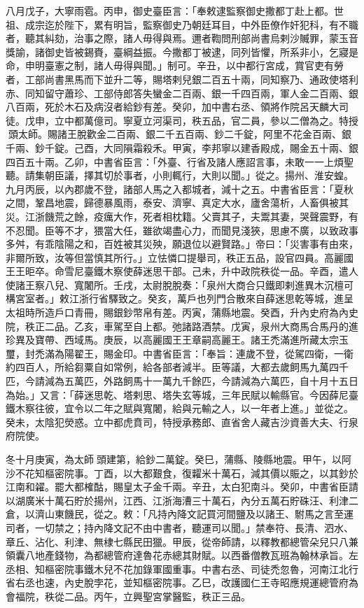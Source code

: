 \begin{pinyinscope}
 八月戊子，大寧雨雹。丙申，御史臺臣言：「奉敕逮監察御史撒都丁赴上都。世祖、成宗迄於陛下，累有明旨，監察御史乃朝廷耳目，中外臣僚作奸犯科，有不職者，聽其糾劾，治事之際，諸人毋得與焉。邇者鞫問刑部尚書烏剌沙贓罪，蒙玉音獎諭，諸御史皆被錫賚，臺綱益振。今撒都丁被逮，同列皆懼，所系非小，乞寢是命，申明臺憲之制，諸人毋得與聞。」制可。辛丑，以中都行宮成，賞官吏有勞者，工部尚書黑馬而下並升二等，賜塔剌兒銀二百五十兩，同知察乃、通政使塔利赤、同知留守蕭珍、工部侍郎答失蠻金二百兩、銀一千四百兩，軍人金二百兩、銀八百兩，死於木石及病沒者給鈔有差。癸卯，加中書右丞、領將作院呂天麟大司徒。戊申，立中都萬億司。寧夏立河渠司，秩五品，官二員，參以二僧為之。特授頭太師。賜諸王脫歡金二百兩、銀二千五百兩、鈔二千錠，阿里不花金百兩、銀千兩、鈔千錠。己酉，大同隕霜殺禾。甲寅，李邦寧以建香殿成，賜金五十兩、銀四百五十兩。乙卯，中書省臣言：「外臺、行省及諸人應詔言事，未敢一一上煩聖聽。請集朝臣議，擇其切於事者，小則輒行，大則以聞。」從之。揚州、淮安蝗。九月丙辰，以內郡歲不登，諸部人馬之入都城者，減十之五。中書省臣言：「夏秋之間，鞏昌地震，歸德暴風雨，泰安、濟寧、真定大水，廬舍蕩析，人畜俱被其災。江浙饑荒之餘，疫癘大作，死者相枕籍。父賣其子，夫鬻其妻，哭聲震野，有不忍聞。臣等不才，猥當大任，雖欲竭盡心力，而聞見淺狹，思慮不廣，以致政事多舛，有乖陰陽之和，百姓被其災殃，願退位以避賢路。」帝曰：「災害事有由來，非爾所致，汝等但當慎其所行。」立怯憐口提舉司，秩正五品，設官四員。高麗國王王昛卒。命雪尼臺鐵木察使薛迷思干部。己未，升中政院秩從一品。辛酉，遣人使諸王察八兒、寬闍所。壬戌，太尉脫脫奏：「泉州大商合只鐵即剌進異木沉檀可構宮室者。」敕江浙行省驛致之。癸亥，萬戶也列門合散來自薛迷思乾等城，進呈太祖時所造戶口青冊，賜銀鈔幣帛有差。丙寅，蒲縣地震。癸酉，升內史府為內史院，秩正二品。乙亥，車駕至自上都。弛諸路酒禁。戊寅，泉州大商馬合馬丹的進珍異及寶帶、西域馬。庚辰，以高麗國王王章嗣高麗王。諸王禿滿進所藏太宗玉璽，封禿滿為陽翟王，賜金印。中書省臣言：「奉旨：連歲不登，從駕四衛，一衛約四百人，所給芻粟自如常例，給各部者減半。臣等議，大都去歲飼馬九萬四千匹，今請減為五萬匹，外路飼馬十一萬九千餘匹，今請減為六萬匹，自十月十五日為始。」又言：「薛迷思乾、塔剌思、塔失玄等城，三年民賦以輸縣官。今因薛尼臺鐵木察往彼，宜令以二年之賦與寬闍，給與元輸之人，以一年者上進。」並從之。癸未，太陰犯熒惑。立中都虎賁司，特授承務郎、直省舍人藏吉沙資善大夫、行泉府院使。



 冬十月庚寅，為太師頭建第，給鈔二萬錠。癸巳，蒲縣、陵縣地震。甲午，以阿沙不花知樞密院事。丁酉，以大都艱食，復糶米十萬石，減其價以賑之，以其鈔於江南和糴。罷大都榷酤，賜皇太子金千兩。辛丑，太白犯南斗。癸卯，中書省臣請以湖廣米十萬石貯於揚州，江西、江浙海漕三十萬石，內分五萬石貯硃汪、利津二倉，以濟山東饑民，從之。敕：「凡持內降文記買河間鹽及以諸王、駙馬之言至運司者，一切禁之；持內降文記不由中書者，聽運司以聞。」禁奉符、長清、泗水、章丘、沾化、利津、無棣七縣民田獵。甲辰，從帝師請，以釋教都總管朵兒只八兼領囊八地產錢物，為都總管府達魯花赤總其財賦。以西番僧教瓦班為翰林承旨。左丞相、知樞密院事鐵木兒不花加錄軍國重事。中書右丞、司徒禿忽魯，河南江北行省右丞也速，內史脫孛花，並知樞密院事。乙巳，改護國仁王寺昭應規運總管府為會福院，秩從二品。丙午，立興聖宮掌醫監，秩正三品。




\end{pinyinscope}
